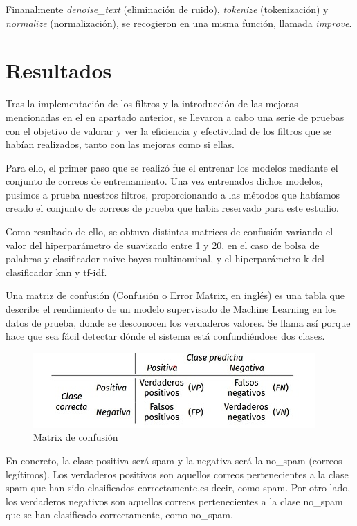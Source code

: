 \documentclass[conference,a4paper]{IEEEtran}
\begin{document}
Finanalmente \textit{denoise\_text} (eliminación de ruido), \textit{tokenize} (tokenización) y \textit{normalize} (normalización), se recogieron en una misma función, llamada \textit{improve}.


\section{Resultados}

Tras la implementación de los filtros y la introducción de las mejoras mencionadas en el en apartado anterior, se llevaron a cabo una serie de pruebas con el objetivo de valorar y ver la eficiencia y efectividad de los filtros que se habían realizados, tanto con las mejoras como si ellas. 

Para ello, el primer paso que se realizó fue el entrenar los modelos mediante el conjunto de correos de entrenamiento. Una vez entrenados dichos modelos, pusimos a prueba nuestros filtros, proporcionando a las métodos que habíamos creado el conjunto de correos de prueba que habia reservado para este estudio. 

 
Como resultado de ello, se obtuvo distintas matrices de confusión variando el valor del hiperparámetro de suavizado entre 1 y 20, en el caso de bolsa de palabras y clasificador naive bayes multinominal, y el hiperparámetro k del clasificador knn y tf-idf.

Una matriz de confusión (Confusión o Error Matrix, en inglés) es una tabla que  describe el rendimiento de un modelo supervisado de Machine Learning en los datos de prueba, donde se desconocen los verdaderos valores. Se llama así porque hace que sea fácil detectar dónde el sistema está confundiéndose dos clases.~\cite{b28}
\\

\begin{figure}[hbtp]
\centering
\includegraphics[scale=1]{matrix.jpg}
\caption{Matrix de confusión}
\end{figure}

En concreto, la clase positiva será spam y la negativa será la no\_spam (correos legítimos). Los verdaderos positivos son aquellos correos pertenecientes a la clase spam que han sido clasificados correctamente,es decir, como spam. Por otro lado, los verdaderos negativos son aquellos correos pertenecientes a la clase no\_spam que se han clasificado correctamente, como no\_spam.
\end{document}
